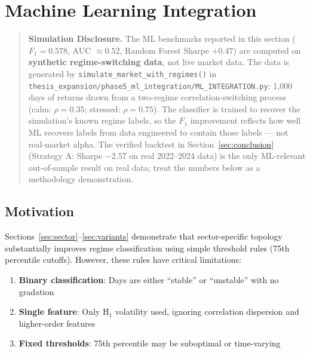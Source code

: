 
\section{Machine Learning Integration}
\label{sec:ml}

\begin{quote}
\noindent\textbf{Simulation Disclosure.} The ML benchmarks reported in this section ($F_1 = 0.578$, AUC $\approx 0.52$, Random Forest Sharpe $+0.47$) are computed on \textbf{synthetic regime-switching data}, not live market data. The data is generated by \texttt{simulate\_market\_with\_regimes()} in \texttt{thesis\_expansion/phase5\_ml\_integration/ML\_INTEGRATION.py}: 1{,}000 days of returns drawn from a two-regime correlation-switching process (calm: $\rho = 0.35$; stressed: $\rho = 0.75$). The classifier is trained to recover the simulation's known regime labels, so the $F_1$ improvement reflects how well ML recovers labels from data engineered to contain those labels --- not real-market alpha. The verified backtest in Section~\ref{sec:conclusion} (Strategy A: Sharpe $-2.57$ on real 2022--2024 data) is the only ML-relevant out-of-sample result on real data; treat the numbers below as a methodology demonstration.
\end{quote}

\subsection{Motivation}

Sections~\ref{sec:sector}--\ref{sec:variants} demonstrate that sector-specific topology substantially improves regime classification using simple threshold rules (75th percentile cutoffs). However, these rules have critical limitations:

\begin{enumerate}
    \item \textbf{Binary classification}: Days are either ``stable'' or ``unstable'' with no gradation
    \item \textbf{Single feature}: Only H$_1$ volatility used, ignoring correlation dispersion and higher-order features
    \item \textbf{Fixed thresholds}: 75th percentile may be suboptimal or time-varying
\end{enumerate}

